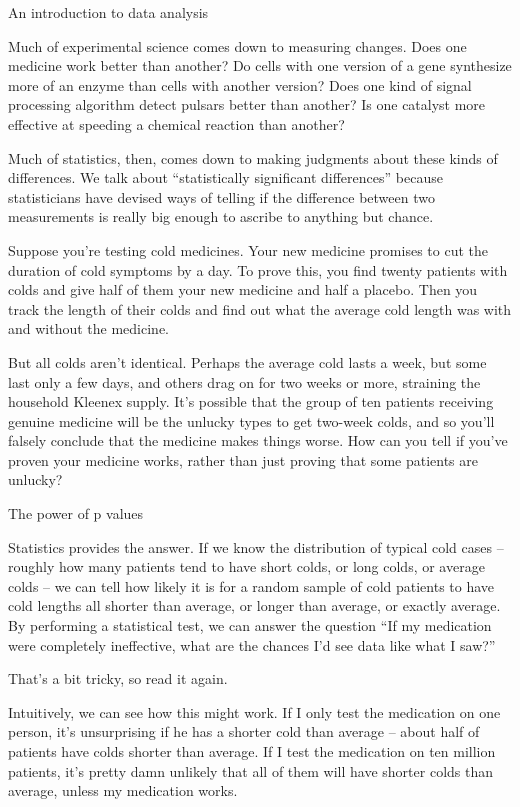 
An introduction to data analysis

Much of experimental science comes down to measuring changes. Does one medicine work better than another? Do cells with one version of a gene synthesize more of an enzyme than cells with another version? Does one kind of signal processing algorithm detect pulsars better than another? Is one catalyst more effective at speeding a chemical reaction than another?

Much of statistics, then, comes down to making judgments about these kinds of differences. We talk about “statistically significant differences” because statisticians have devised ways of telling if the difference between two measurements is really big enough to ascribe to anything but chance.

Suppose you’re testing cold medicines. Your new medicine promises to cut the duration of cold symptoms by a day. To prove this, you find twenty patients with colds and give half of them your new medicine and half a placebo. Then you track the length of their colds and find out what the average cold length was with and without the medicine.

But all colds aren’t identical. Perhaps the average cold lasts a week, but some last only a few days, and others drag on for two weeks or more, straining the household Kleenex supply. It’s possible that the group of ten patients receiving genuine medicine will be the unlucky types to get two-week colds, and so you’ll falsely conclude that the medicine makes things worse. How can you tell if you’ve proven your medicine works, rather than just proving that some patients are unlucky?


The power of p values

Statistics provides the answer. If we know the distribution of typical cold cases – roughly how many patients tend to have short colds, or long colds, or average colds – we can tell how likely it is for a random sample of cold patients to have cold lengths all shorter than average, or longer than average, or exactly average. By performing a statistical test, we can answer the question “If my medication were completely ineffective, what are the chances I’d see data like what I saw?”

That’s a bit tricky, so read it again.

Intuitively, we can see how this might work. If I only test the medication on one person, it’s unsurprising if he has a shorter cold than average – about half of patients have colds shorter than average. If I test the medication on ten million patients, it’s pretty damn unlikely that all of them will have shorter colds than average, unless my medication works.

